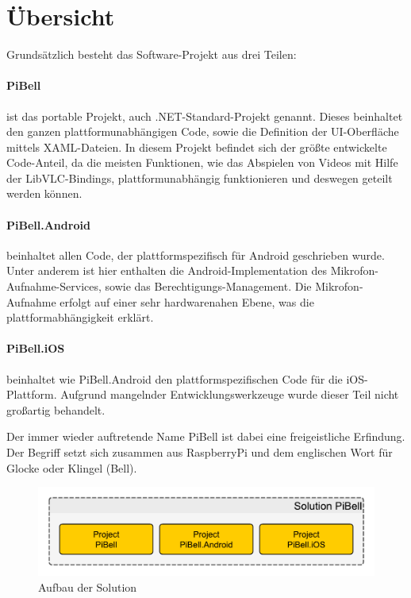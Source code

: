 
\label{ch:prog-doc}
\section{Übersicht}
Grundsätzlich besteht das Software-Projekt aus drei Teilen:
\paragraph{PiBell} ist das portable Projekt, auch .NET-Standard-Projekt genannt.
Dieses beinhaltet den ganzen plattformunabhängigen Code, sowie die Definition der UI-Oberfläche mittels XAML-Dateien.
In diesem Projekt befindet sich der größte entwickelte Code-Anteil, da die meisten Funktionen, wie das Abspielen von Videos mit Hilfe der LibVLC-Bindings, plattformunabhängig funktionieren und deswegen geteilt werden können.

\paragraph{PiBell.Android} beinhaltet allen Code, der plattformspezifisch für Android geschrieben wurde.
Unter anderem ist hier enthalten die Android-Implementation des Mikrofon-Auf\-nahme-Services, sowie das Berechtigungs-Management.
Die Mikrofon-Aufnahme erfolgt auf einer sehr hardwarenahen Ebene, was die plattformabhängigkeit erklärt.

\paragraph{PiBell.iOS} beinhaltet wie PiBell.Android den plattformspezifischen Code für die iOS-Platt\-form. Aufgrund mangelnder Entwicklungswerkzeuge wurde dieser Teil nicht großartig behandelt.\par
Der immer wieder auftretende Name PiBell ist dabei eine freigeistliche Erfindung. Der Begriff setzt sich zusammen aus RaspberryPi und dem englischen Wort für Glocke oder Klingel (Bell).\par
\begin{figure}[H]
\centering\includegraphics[width=0.9\linewidth]{images/xamarin/struktur.pdf}
\caption{Aufbau der Solution}
\end{figure}

